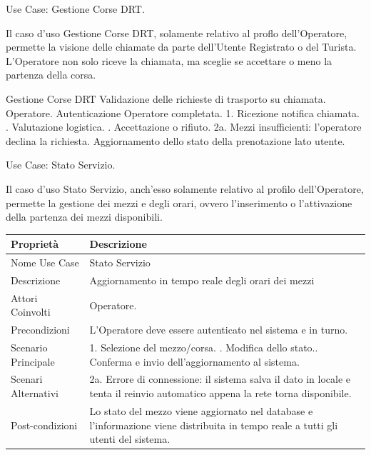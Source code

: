 \begin{center}
    Use Case: Gestione Corse DRT. 
\end{center}
Il caso d'uso Gestione Corse DRT, solamente relativo al proflo dell'Operatore, permette la visione delle chiamate da parte dell'Utente Registrato o del Turista.\\  L'Operatore non solo riceve la chiamata, ma sceglie se accettare o meno la partenza della corsa.

\vspace{0.5cm}

\usecasetable
{Gestione Corse DRT}
{Validazione delle richieste di trasporto su chiamata.}
{Operatore.}
{Autenticazione Operatore completata.}
{1. Ricezione notifica chiamata. . Valutazione logistica. . Accettazione o rifiuto.}
{2a. Mezzi insufficienti: l'operatore declina la richiesta.}
{Aggiornamento dello stato della prenotazione lato utente.}
\newpage

\begin{center}
    Use Case: Stato Servizio.
\end{center}
Il caso d'uso Stato Servizio, anch'esso solamente relativo al profilo dell'Operatore, permette la gestione dei mezzi e degli orari, ovvero l'inserimento o l'attivazione della partenza dei mezzi disponibili.

\vspace{0.5cm}

\begin{table}[htbp]
\centering
\renewcommand{\arraystretch}{1.4}
\begin{tabular}{l p{10.5cm}}
\toprule
\textbf{Proprietà} & \textbf{Descrizione} \\
\midrule
Nome Use Case & Stato Servizio \\
Descrizione & Aggiornamento in tempo reale degli orari dei mezzi \\
Attori Coinvolti & Operatore. \\
Precondizioni & L'Operatore deve essere autenticato nel sistema e in turno. \\
Scenario Principale & 
1. Selezione del mezzo/corsa. \newline
2. Modifica dello stato.\newline
3. Conferma e invio dell'aggiornamento al sistema. \\
Scenari Alternativi & 2a. Errore di connessione: il sistema salva il dato in locale e tenta il reinvio automatico appena la rete torna disponibile. \\
Post-condizioni & Lo stato del mezzo viene aggiornato nel database e l'informazione viene distribuita in tempo reale a tutti gli utenti del sistema. \\
\bottomrule
\end{tabular}
\label{tab:uc_statoservizio}
\end{table}

